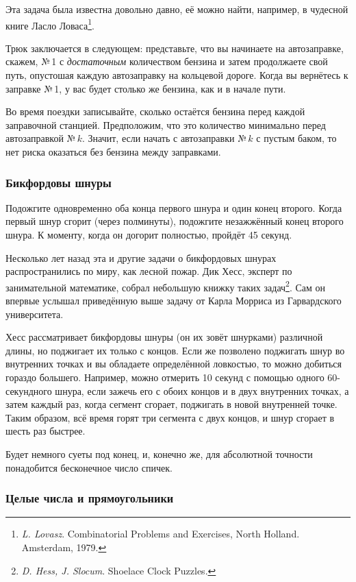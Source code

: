 \documentclass[twoside]{book}
\begin{document}
Эта задача была известна довольно давно, её можно найти, например, в чудесной книге Ласло Ловаса\footnote{\emph{L. Lovasz}. {Combinatorial Problems and Exercises}, North Holland. Amsterdam, 1979.}.


Трюк заключается в следующем:
представьте, что вы начинаете на автозаправке, скажем, №\,1 с \emph{достаточным} количеством бензина и затем продолжаете свой путь, опустошая каждую автозаправку на кольцевой дороге.
Когда вы вернётесь к заправке №\,1, 
у вас будет столько же бензина, как и в начале пути.

Во время поездки записывайте, сколько остаётся бензина перед каждой заправочной станцией.
Предположим, что это количество минимально перед автозаправкой №\,$k$.
Значит, если начать с автозаправки №\,$k$ с пустым баком, то нет риска оказаться без бензина между заправками.
\heart

\subsubsection*{Бикфордовы шнуры} %

Подожгите одновременно оба конца первого шнура и один конец второго.
Когда первый шнур сгорит (через полминуты), подожгите незажжённый конец второго шнура.
К моменту, когда он догорит полностью, пройдёт 45 секунд.
\heart

Несколько лет назад эта и другие задачи о бикфордовых шнурах распространились по миру, как лесной пожар.
Дик Хесс, эксперт по занимательной математике, 
собрал небольшую книжку таких задач\footnote{\emph{D. Hess, J. Slocum}. {Shoelace Clock Puzzles}.}.
Сам он впервые услышал приведённую выше задачу от Карла Морриса из Гарвардского университета.

Хесс рассматривает бикфордовы шнуры (он их зовёт шнурками) различной длины, но поджигает их только с концов.
Если же позволено поджигать шнур во внутренних точках и вы обладаете определённой ловкостью, то можно добиться гораздо большего.
Например, можно отмерить 10 секунд с помощью одного 60-секундного шнура, если зажечь его с обоих концов и в двух внутренних точках, а затем каждый раз, когда сегмент сгорает, поджигать в новой внутренней точке.
Таким образом, всё время горят три сегмента с двух концов, и шнур сгорает в шесть раз быстрее.

Будет немного суеты под конец, и, конечно же, для абсолютной точности
понадобится бесконечное число спичек.

\subsubsection*{Целые числа и прямоугольники} %
\end{document}
